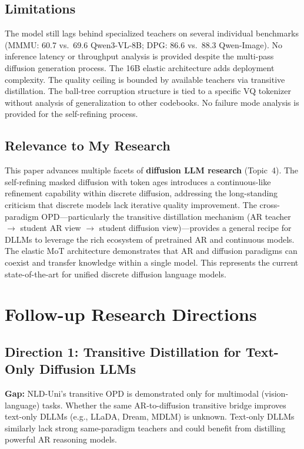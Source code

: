 \documentclass[11pt,a4paper]{article}
\begin{document}
\subsection{Limitations}
The model still lags behind specialized teachers on several individual benchmarks (MMMU: 60.7 vs.\ 69.6 Qwen3-VL-8B; DPG: 86.6 vs.\ 88.3 Qwen-Image). No inference latency or throughput analysis is provided despite the multi-pass diffusion generation process. The 16B elastic architecture adds deployment complexity. The quality ceiling is bounded by available teachers via transitive distillation. The ball-tree corruption structure is tied to a specific VQ tokenizer without analysis of generalization to other codebooks. No failure mode analysis is provided for the self-refining process.

\subsection{Relevance to My Research}
This paper advances multiple facets of \textbf{diffusion LLM research} (Topic~4). The self-refining masked diffusion with token ages introduces a continuous-like refinement capability within discrete diffusion, addressing the long-standing criticism that discrete models lack iterative quality improvement. The cross-paradigm OPD---particularly the transitive distillation mechanism (AR teacher $\to$ student AR view $\to$ student diffusion view)---provides a general recipe for DLLMs to leverage the rich ecosystem of pretrained AR and continuous models. The elastic MoT architecture demonstrates that AR and diffusion paradigms can coexist and transfer knowledge within a single model. This represents the current state-of-the-art for unified discrete diffusion language models.

\section{Follow-up Research Directions}

\subsection{Direction 1: Transitive Distillation for Text-Only Diffusion LLMs}
\textbf{Gap:} NLD-Uni's transitive OPD is demonstrated only for multimodal (vision-language) tasks. Whether the same AR-to-diffusion transitive bridge improves text-only DLLMs (e.g., LLaDA, Dream, MDLM) is unknown. Text-only DLLMs similarly lack strong same-paradigm teachers and could benefit from distilling powerful AR reasoning models.
\end{document}
